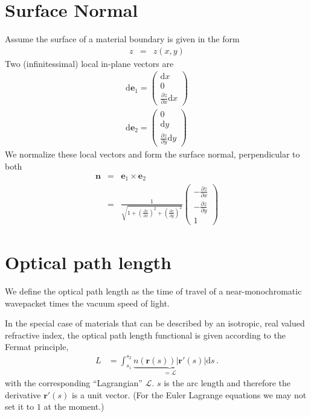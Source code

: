 \documentclass[12pt,a4paper,twoside,openright,BCOR10mm,headsepline,titlepage,abstracton,chapterprefix,final]{scrreprt}
\newcommand\Vector[1]{{\mathbf{#1}}}
\newcommand\totald{\textrm{d}}
\begin{document}
\section{Surface Normal}
Assume the surface of a material boundary is given in the form
\begin{eqnarray}
 z &=& z(x,y)
\end{eqnarray}
Two (infinitessimal) local in-plane vectors are 
\begin{eqnarray}
\totald\Vector{e}_1 = \begin{pmatrix}
                 \totald x \\ 0 \\ \frac{\partial z}{\partial x} \totald x
                \end{pmatrix}
\\
\totald\Vector{e}_2 = \begin{pmatrix}
                 0 \\ \totald y \\ \frac{\partial z}{\partial y} \totald y
                \end{pmatrix}
\end{eqnarray}
We normalize these local vectors and form the surface normal, perpendicular to both
\begin{eqnarray}
 \Vector{n} &=& \Vector{e}_1 \times \Vector{e}_2 \\
 &=& 
   \frac{1}{\sqrt{ 1 + \left( \frac{\partial z}{\partial x} \right)^2 + \left( \frac{\partial z}{\partial y} \right)^2 }}
   \begin{pmatrix}
    - \frac{\partial z}{\partial x} \\ - \frac{\partial z}{\partial y} \\ 1
   \end{pmatrix}
\end{eqnarray}

\section{Optical path length}
We define the optical path length as the time of travel of a near-monochromatic wavepacket times the vacuum speed of light.

In the special case of materials that can be described by an isotropic, real valued refractive index, the optical path length functional is given according to the Fermat principle,
\begin{align}
 L &= \int_{s_1}^{s_2} \underbrace{n(\Vector{r}(s)) |\Vector{r}'(s)|}_{=\mathcal{L}} \totald s\,.\label{eq:fermatiso}
\end{align}
with the corresponding ``Lagrangian'' $\mathcal{L}$.
$s$ is the arc length and therefore the derivative $\Vector{r}'(s)$ is a unit vector. (For the Euler Lagrange
equations we may not set it to $1$ at the moment.)
\end{document}
